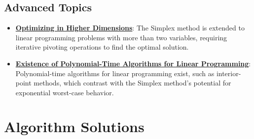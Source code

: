 \documentclass{article}%
\begin{document}
%
\subsection{Advanced Topics}%
\label{subsec:AdvancedTopics}%
\begin{itemize}[leftmargin=*]%
\item \href{https://www.math.purdue.edu/~yipn/421//2024-08-27-ExSimplex.pdf#page=17}{\textbf{Optimizing in Higher Dimensions}}: The Simplex method is extended to linear programming problems with more than two variables, requiring iterative pivoting operations to find the optimal solution.%
\item \href{https://www.math.purdue.edu/~yipn/421//2024-09-05-SimplexEfficiency.pdf#page=12}{\textbf{Existence of Polynomial-Time Algorithms for Linear Programming}}: Polynomial-time algorithms for linear programming exist, such as interior-point methods, which contrast with the Simplex method's potential for exponential worst-case behavior.%
\end{itemize}

%
\section{Algorithm Solutions}%
\label{sec:AlgorithmSolutions}%
\end{document}
